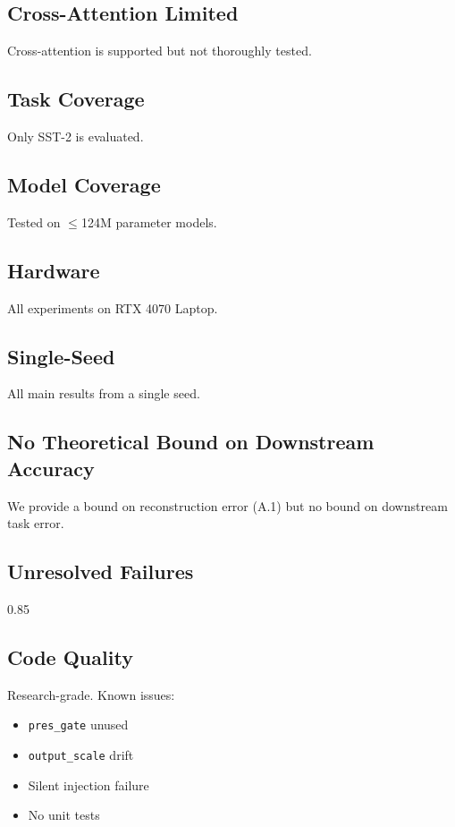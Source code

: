 \subsection{Cross-Attention Limited}

Cross-attention is supported but not thoroughly tested.

\subsection{Task Coverage}

Only SST-2 is evaluated.

\subsection{Model Coverage}

Tested on $\le$124M parameter models.

\subsection{Hardware}

All experiments on RTX 4070 Laptop.

\subsection{Single-Seed}

All main results from a single seed.

\subsection{No Theoretical Bound on Downstream Accuracy}

We provide a bound on reconstruction error (A.1) but no bound on 
downstream task error.

\subsection{Unresolved Failures}

0.85

\subsection{Code Quality}

Research-grade. Known issues:
\begin{itemize}
\item \texttt{pres\_gate} unused
\item \texttt{output\_scale} drift
\item Silent injection failure
\item No unit tests

\end{itemize}


